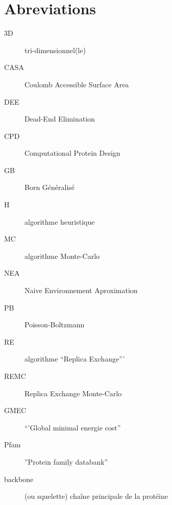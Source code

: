\chapter*{Abreviations}

\begin{multicols}{2}

\begin{description}
\item[3D] tri-dimensionnel(le)
\item [CASA] Coulomb Accessible Surface Area
\item [DEE] Dead-End Elimination 
\item[CPD] Computational Protein Design
\item [GB] Born Généralisé
\item[H] algorithme heuristique
\item[MC] algorithme Monte-Carlo
\item[NEA] Naive Environnement Aproximation
\item [PB] Poisson-Boltzmann
\item[RE] algorithme ``Replica Exchange'''
\item [REMC] Replica Exchange Monte-Carlo
\item[GMEC] ``'Global minimal energie cost''
\item[Pfam] ''Protein family databank''
\item[backbone]  (ou squelette) chaîne principale de la protéine  
\end{description}

\end{multicols}


